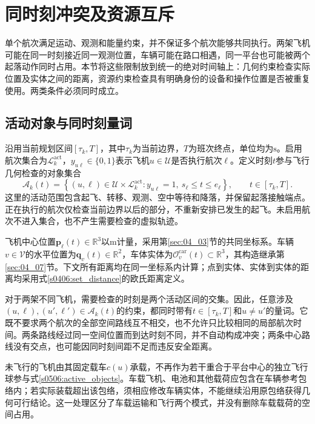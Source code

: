 \section{同时刻冲突及资源互斥}
\label{sec:05_06}

单个航次满足运动、观测和能量约束，并不保证多个航次能够共同执行。两架飞机可能在同一时刻接近同一观测位置，车辆可能在路口相遇，同一平台也可能被两个起落动作同时占用。本节将这些限制放到统一的绝对时间轴上：几何约束检查实际位置及实体之间的距离，资源约束检查具有明确身份的设备和操作位置是否被重复使用。两类条件必须同时成立。

\subsection{活动对象与同时刻量词}

沿用当前规划区间$[\tau_k,T]$，其中$\tau_k$为当前边界，$T$为班次终点，单位均为$\mathrm s$。启用航次集合为$\mathcal L_k^{\mathrm{act}}$，$y_{u\ell}\in\{0,1\}$表示飞机$u\in\mathcal U$是否执行航次$\ell$。定义时刻$t$参与飞行几何检查的对象集合
\begin{equation}
 \mathcal A_k(t)=
 \left\{(u,\ell)\in\mathcal U\times\mathcal L_k^{\mathrm{act}}:
 y_{u\ell}=1,\ s_\ell\le t\le e_\ell\right\},
 \qquad t\in[\tau_k,T].
 \label{s0506:active_objects}
\end{equation}
这里的活动范围包含起飞、转移、观测、空中等待和降落，并保留起落接触端点。正在执行的航次仅检查当前边界以后的部分，不重新安排已发生的起飞。未启用航次不进入集合，也不产生需要检查的虚拟轨迹。

飞机中心位置$\mathbf p_\ell(t)\in\mathbb R^3$以$\mathrm m$计量，采用第\ref{sec:04_03}节的共同坐标系。车辆$v\in\mathcal V$的水平位置为$\mathbf q_v(t)\in\mathbb R^2$，车体实体为$\mathcal O_v^{\mathrm{car}}(t)\subset\mathbb R^3$，其构造继承第\ref{sec:04_07}节。下文所有距离均在同一坐标系内计算；点到实体、实体到实体的距离均采用式\eqref{s0406:set_distance}的欧氏距离定义。

对于两架不同飞机，需要检查的时刻是两个活动区间的交集。因此，任意涉及$(u,\ell),(u',\ell')\in\mathcal A_k(t)$的约束，都同时带有$t\in[\tau_k,T]$和$u\ne u'$的量词。它既不要求两个航次的全部空间路线互不相交，也不允许只比较相同的局部航次时间。两条路线经过同一空间位置而到达时刻不同，并不自动构成冲突；两条中心路线没有交点，也可能因同时刻间距不足而违反安全距离。

未飞行的飞机由其固定载车$c(u)$承载，不再作为若干重合于平台中心的独立飞行球参与式\eqref{s0506:active_objects}。车载飞机、电池和其他载荷应包含在车辆参考包络内；若实际装载超出该包络，须相应修改车辆实体，不能继续沿用原包络获得几何可行结论。这一处理区分了车载运输和飞行两个模式，并没有删除车载载荷的空间占用。

